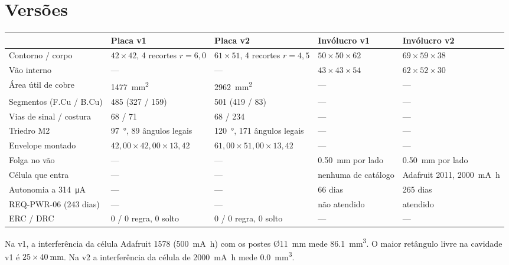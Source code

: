 \documentclass[10pt,a4paper,landscape]{article}
\begin{document}
\section{Versões}

\begin{table}[H]\footnotesize
\begin{tabularx}{\textwidth}{@{}Y{1.1} Y{1.0} Y{1.0} | Y{0.9} Y{1.0}@{}}
\toprule
 & \textbf{Placa v1} & \textbf{Placa v2} & \textbf{Invólucro v1} & \textbf{Invólucro v2} \\
\midrule
Contorno / corpo & $42\times42$, 4 recortes $r=6{,}0$ & $61\times51$, 4 recortes $r=4{,}5$ & $50\times50\times62$ & $69\times59\times38$ \\
Vão interno & --- & --- & $43\times43\times54$ & $62\times52\times30$ \\
Área útil de cobre & \SI{1477}{\milli\meter\squared} & \SI{2962}{\milli\meter\squared} & --- & --- \\
Segmentos (F.Cu / B.Cu) & 485 (327 / 159) & 501 (419 / 83) & --- & --- \\
Vias de sinal / costura & 68 / 71 & 68 / 234 & --- & --- \\
Triedro M2 & \SI{97}{\degree}, 89 ângulos legais & \SI{120}{\degree}, 171 ângulos legais & --- & --- \\
Envelope montado & $42{,}00\times42{,}00\times13{,}42$ & $61{,}00\times51{,}00\times13{,}42$ & --- & --- \\
Folga no vão & --- & --- & \SI{0.50}{\milli\meter} por lado & \SI{0.50}{\milli\meter} por lado \\
Célula que entra & --- & --- & nenhuma de catálogo & Adafruit 2011, \SI{2000}{\milli\ampere\hour} \\
Autonomia a \SI{314}{\micro\ampere} & --- & --- & 66 dias & 265 dias \\
REQ-PWR-06 (243 dias) & --- & --- & não atendido & atendido \\
ERC / DRC & 0 / 0 regra, 0 solto & 0 / 0 regra, 0 solto & --- & --- \\
\bottomrule
\end{tabularx}
\end{table}

Na v1, a interferência da célula Adafruit 1578 (\SI{500}{\milli\ampere\hour}) com os postes Ø\SI{11}{\milli\meter} mede \SI{86.1}{\milli\meter\cubed}. O maior retângulo livre na cavidade v1 é $25\times\SI{40}{\milli\meter}$. Na v2 a interferência da célula de \SI{2000}{\milli\ampere\hour} mede \SI{0.0}{\milli\meter\cubed}.
\end{document}
